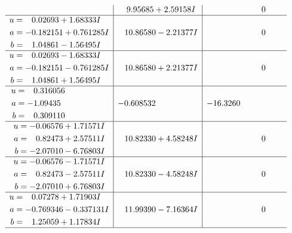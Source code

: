 \documentclass[1p]{elsarticle_modified}
\theoremstyle{definition}
\begin{document}
$$\begin{array}{c|c|c}
 & \phantom{-}9.95685 + 2.59158 I & \phantom{-0.000000 } 0 \\ \hline\begin{aligned}
u &= \phantom{-}0.02693 + 1.68333 I \\
a &= -0.182151 + 0.761285 I \\
b &= \phantom{-}1.04861 - 1.56495 I\end{aligned}
 & \phantom{-}10.86580 - 2.21377 I & \phantom{-0.000000 } 0 \\ \hline\begin{aligned}
u &= \phantom{-}0.02693 - 1.68333 I \\
a &= -0.182151 - 0.761285 I \\
b &= \phantom{-}1.04861 + 1.56495 I\end{aligned}
 & \phantom{-}10.86580 + 2.21377 I & \phantom{-0.000000 } 0 \\ \hline\begin{aligned}
u &= \phantom{-}0.316056\phantom{ +0.000000I} \\
a &= -1.09435\phantom{ +0.000000I} \\
b &= \phantom{-}0.309110\phantom{ +0.000000I}\end{aligned}
 & -0.608532\phantom{ +0.000000I} & -16.3260\phantom{ +0.000000I} \\ \hline\begin{aligned}
u &= -0.06576 + 1.71571 I \\
a &= \phantom{-}0.82473 + 2.57511 I \\
b &= -2.07010 - 6.76803 I\end{aligned}
 & \phantom{-}10.82330 + 4.58248 I & \phantom{-0.000000 } 0 \\ \hline\begin{aligned}
u &= -0.06576 - 1.71571 I \\
a &= \phantom{-}0.82473 - 2.57511 I \\
b &= -2.07010 + 6.76803 I\end{aligned}
 & \phantom{-}10.82330 - 4.58248 I & \phantom{-0.000000 } 0 \\ \hline\begin{aligned}
u &= \phantom{-}0.07278 + 1.71903 I \\
a &= -0.769346 - 0.337131 I \\
b &= \phantom{-}1.25059 + 1.17834 I\end{aligned}
 & \phantom{-}11.99390 - 7.16364 I & \phantom{-0.000000 } 0\\
 \hline 
 \end{array}$$\newpage$$\begin{array}{c|c|c}  

\end{array}$$
\end{document}
